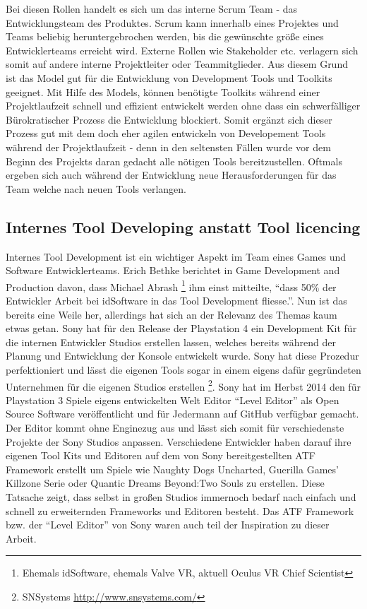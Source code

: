 \documentclass[pagesize, paper=a4, fontsize=12pt,titlepage=true, headings=small, headnosepline, abstractoff, liststotoc, nochapterprefix, plainheadsepline, twoside]{scrreprt}
\begin{document}
Bei diesen Rollen handelt es sich um das interne Scrum Team - das Entwicklungsteam des Produktes. Scrum kann innerhalb eines Projektes und Teams beliebig heruntergebrochen werden, bis die gewünschte größe eines Entwicklerteams erreicht wird. Externe Rollen wie Stakeholder etc. verlagern sich somit auf andere interne Projektleiter oder Teammitglieder. Aus diesem Grund ist das Model gut für die Entwicklung von Development Tools und Toolkits geeignet. Mit Hilfe des Models, können benötigte Toolkits während einer Projektlaufzeit schnell und effizient entwickelt werden ohne dass ein schwerfälliger Bürokratischer Prozess die Entwicklung blockiert. Somit ergänzt sich dieser Prozess gut mit dem doch eher agilen entwickeln von Developement Tools während der Projektlaufzeit - denn in den seltensten Fällen wurde vor dem Beginn des Projekts daran gedacht alle nötigen Tools bereitzustellen. Oftmals ergeben sich auch während der Entwicklung neue Herausforderungen für das Team welche nach neuen Tools verlangen.

\subsection{Internes Tool Developing anstatt Tool licencing} %
Internes Tool Development ist ein wichtiger Aspekt im Team eines Games und Software Entwicklerteams. Erich Bethke berichtet in Game Development and Production davon, dass Michael Abrash \footnote{Ehemals idSoftware, ehemals Valve VR, aktuell Oculus VR Chief Scientist} ihm einst mitteilte, “dass 50\% der Entwickler Arbeit bei idSoftware in das Tool Development fliesse.”. Nun ist das bereits eine Weile her, allerdings hat sich an der Relevanz des Themas kaum etwas getan. Sony hat für den Release der Playstation 4 ein Development Kit  für die internen Entwickler Studios  erstellen lassen, welches bereits während der Planung und Entwicklung der Konsole entwickelt wurde. Sony hat diese Prozedur perfektioniert und lässt die eigenen Tools sogar in einem eigens dafür gegründeten Unternehmen für die eigenen Studios erstellen \footnote{SNSystems \url{http://www.snsystems.com/}}. Sony hat im Herbst 2014 den für Playstation 3 Spiele eigens entwickelten Welt Editor “Level Editor” als Open Source Software veröffentlicht und für Jedermann auf GitHub verfügbar gemacht. Der Editor kommt ohne Enginezug aus und lässt sich somit für verschiedenste Projekte der Sony Studios anpassen. Verschiedene Entwickler haben darauf ihre eigenen Tool Kits und Editoren auf dem von Sony bereitgestellten ATF Framework erstellt um Spiele wie Naughty Dogs Uncharted, Guerilla Games’ Killzone Serie oder Quantic Dreams Beyond:Two Souls zu erstellen. Diese Tatsache zeigt, dass selbst in großen Studios immernoch bedarf nach einfach und schnell zu erweiternden Frameworks und Editoren besteht. Das ATF Framework bzw. der “Level Editor” von Sony waren auch teil der Inspiration zu dieser Arbeit.
\end{document}
